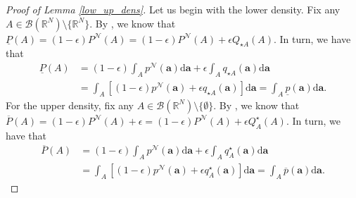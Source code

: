 \documentclass[12pt, english, oneside, a4paper]{article}
\renewcommand{\a}{\boldsymbol{a}}
\begin{document}


\begin{proof}[Proof of Lemma \ref{low_up_dens}]
Let us begin with the lower density. Fix any $A\in \mathcal{B}(\mathbb{R}^N)\setminus\{\mathbb{R}^N\}$. By \citet[Example 3]{wasserman}, we know that $\underline{P}(A)=(1-\epsilon)P^\mathcal{N}(A)=(1-\epsilon)P^\mathcal{N}(A)+ \epsilon Q_{\star A}(A)$. In turn, we have that
\begin{align*}
    \underline{P}(A)&=(1-\epsilon)\int_A p^\mathcal{N}(\a) \text{d}\a + \epsilon \int_A q_{\star A}(\a) \text{d}\a\\
    &= \int_A \left[(1-\epsilon) p^\mathcal{N}(\a) + \epsilon q_{\star A}(\a) \right] \text{d}\a = \int_A \underline{p}(\a) \text{d}\a.
\end{align*}
For the upper density, fix any $A\in \mathcal{B}(\mathbb{R}^N)\setminus\{\emptyset\}$. By \citet[Example 3]{wasserman}, we know that $\overline{P}(A)=(1-\epsilon)P^\mathcal{N}(A) + \epsilon =(1-\epsilon)P^\mathcal{N}(A)+ \epsilon Q_{A}^\star(A)$. In turn, we have that
\begin{align*}
    \overline{P}(A)&=(1-\epsilon)\int_A p^\mathcal{N}(\a) \text{d}\a + \epsilon \int_A q_{A}^\star(\a) \text{d}\a\\
    &= \int_A \left[(1-\epsilon) p^\mathcal{N}(\a) + \epsilon q_{A}^\star(\a) \right] \text{d}\a = \int_A \overline{p}(\a)  \text{d}\a.
\end{align*}
\end{proof}
\end{document}
